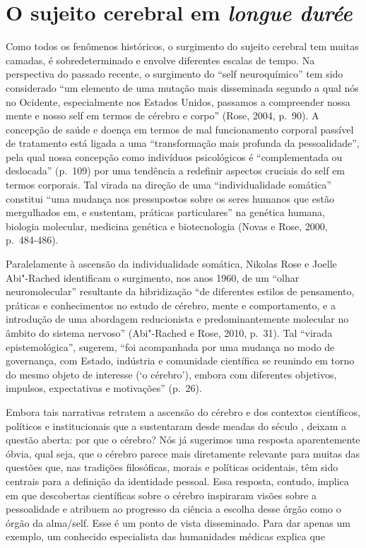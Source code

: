 \section{O sujeito cerebral em \emph{longue durée}}

Como todos os fenômenos históricos, o surgimento do sujeito cerebral tem
muitas camadas, é sobredeterminado e envolve diferentes escalas de
tempo. Na perspectiva do passado recente, o surgimento do ``self
neuroquímico'' tem sido considerado ``um elemento de uma mutação mais
disseminada segundo a qual nós no Ocidente, especialmente nos Estados
Unidos, passamos a compreender nossa mente e nosso self em termos de
cérebro e corpo'' (Rose, 2004, p.~90). A concepção de saúde e doença em
termos de mal funcionamento corporal passível de tratamento está ligada
a uma ``transformação mais profunda da pessoalidade'', pela qual nossa
concepção como indivíduos psicológicos é ``complementada ou deslocada''
(p.~109) por uma tendência a redefinir aspectos cruciais do self em
termos corporais. Tal virada na direção de uma ``individualidade
somática'' constitui ``uma mudança nos pressupostos sobre os seres
humanos que estão mergulhados em, e sustentam, práticas particulares''
na genética humana, biologia molecular, medicina genética e
biotecnologia (Novas e Rose, 2000, p.~484-486).

Paralelamente à ascensão da individualidade somática, Nikolas Rose e
Joelle Abi"-Rached identificam o surgimento, nos anos 1960, de um ``olhar
neuromolecular'' resultante da hibridização ``de diferentes estilos de
pensamento, práticas e conhecimentos no estudo de cérebro, mente e
comportamento, e a introdução de uma abordagem reducionista e
predominantemente molecular no âmbito do sistema nervoso'' (Abi"-Rached e
Rose, 2010, p.~31). Tal ``virada epistemológica'', sugerem, ``foi
acompanhada por uma mudança no modo de governança, com Estado, indústria
e comunidade científica se reunindo em torno do mesmo objeto de
interesse (`o cérebro'), embora com diferentes objetivos, impulsos,
expectativas e motivações'' (p.~26).

Embora tais narrativas retratem a ascensão do cérebro e dos contextos
científicos, políticos e institucionais que a sustentaram desde meadas
do século , deixam a questão aberta: por que o cérebro? Nós já
sugerimos uma resposta aparentemente óbvia, qual seja, que o cérebro
parece mais diretamente relevante para muitas das questões que, nas
tradições filosóficas, morais e políticas ocidentais, têm sido centrais
para a definição da identidade pessoal. Essa resposta, contudo, implica
em que descobertas científicas sobre o cérebro inspiraram visões sobre a
pessoalidade e atribuem ao progresso da ciência a escolha desse órgão
como o órgão da alma/self. Esse é um ponto de vista disseminado. Para
dar apenas um exemplo, um conhecido especialista das humanidades médicas
explica que

